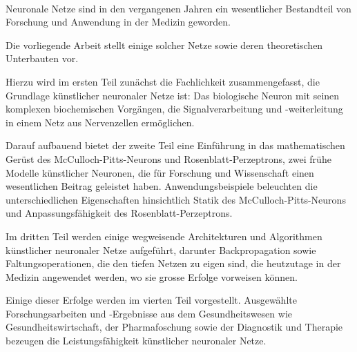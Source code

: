 \kurzfassung

\paragraph*{}

Neuronale Netze sind in den vergangenen Jahren ein wesentlicher Bestandteil von Forschung und Anwendung in der Medizin geworden.

Die vorliegende Arbeit stellt einige solcher Netze sowie deren theoretischen Unterbauten vor.

Hierzu wird im ersten Teil zunächst die Fachlichkeit zusammengefasst, die Grundlage künstlicher neuronaler Netze ist: Das biologische Neuron mit seinen komplexen biochemischen Vorgängen, die Signalverarbeitung und -weiterleitung in einem Netz aus Nervenzellen ermöglichen.

Darauf aufbauend bietet der zweite Teil eine Einführung in das mathematischen Gerüst des McCulloch-Pitts-Neurons und Rosenblatt-Perzeptrons, zwei frühe Modelle künstlicher Neuronen, die für Forschung und Wissenschaft einen wesentlichen Beitrag geleistet haben.
Anwendungsbeispiele beleuchten die unterschiedlichen Eigenschaften hinsichtlich Statik des McCulloch-Pitts-Neurons und Anpassungsfähigkeit des Rosenblatt-Perzeptrons.

Im dritten Teil werden einige wegweisende Architekturen und Algorithmen künstlicher neuronaler Netze aufgeführt, darunter  Backpropagation sowie Faltungsoperationen, die den tiefen Netzen zu eigen sind, die heutzutage in der Medizin angewendet werden, wo sie grosse Erfolge vorweisen können.

Einige dieser Erfolge werden im vierten Teil vorgestellt.
Ausgewählte Forschungsarbeiten und -Ergebnisse aus dem Gesundheitswesen wie Gesundheitswirtschaft, der Pharmafoschung sowie der Diagnostik und Therapie bezeugen die Leistungsfähigkeit künstlicher neuronaler Netze.
